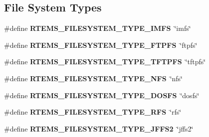 \subsection*{File System Types}
\begin{DoxyCompactItemize}
\item 
\mbox{\label{group__FileSystemTypesAndMount_ga2d3e51f948d15fca2149a164ced80c82}} 
\#define {\bfseries R\+T\+E\+M\+S\+\_\+\+F\+I\+L\+E\+S\+Y\+S\+T\+E\+M\+\_\+\+T\+Y\+P\+E\+\_\+\+I\+M\+FS}~\char`\"{}imfs\char`\"{}
\item 
\mbox{\label{group__FileSystemTypesAndMount_gad37d5c10b7269c04afd547110fd8eba2}} 
\#define {\bfseries R\+T\+E\+M\+S\+\_\+\+F\+I\+L\+E\+S\+Y\+S\+T\+E\+M\+\_\+\+T\+Y\+P\+E\+\_\+\+F\+T\+P\+FS}~\char`\"{}ftpfs\char`\"{}
\item 
\mbox{\label{group__FileSystemTypesAndMount_gabec56985b669ea652cbe5930188073bf}} 
\#define {\bfseries R\+T\+E\+M\+S\+\_\+\+F\+I\+L\+E\+S\+Y\+S\+T\+E\+M\+\_\+\+T\+Y\+P\+E\+\_\+\+T\+F\+T\+P\+FS}~\char`\"{}tftpfs\char`\"{}
\item 
\mbox{\label{group__FileSystemTypesAndMount_gab8c15c488fb84b23c34d3353e13af1c7}} 
\#define {\bfseries R\+T\+E\+M\+S\+\_\+\+F\+I\+L\+E\+S\+Y\+S\+T\+E\+M\+\_\+\+T\+Y\+P\+E\+\_\+\+N\+FS}~\char`\"{}nfs\char`\"{}
\item 
\mbox{\label{group__FileSystemTypesAndMount_ga9ae53861e6e6636d6e5781fa56e54403}} 
\#define {\bfseries R\+T\+E\+M\+S\+\_\+\+F\+I\+L\+E\+S\+Y\+S\+T\+E\+M\+\_\+\+T\+Y\+P\+E\+\_\+\+D\+O\+S\+FS}~\char`\"{}dosfs\char`\"{}
\item 
\mbox{\label{group__FileSystemTypesAndMount_gaebc2a1717f0c19c906e781c57882e587}} 
\#define {\bfseries R\+T\+E\+M\+S\+\_\+\+F\+I\+L\+E\+S\+Y\+S\+T\+E\+M\+\_\+\+T\+Y\+P\+E\+\_\+\+R\+FS}~\char`\"{}rfs\char`\"{}
\item 
\mbox{\label{group__FileSystemTypesAndMount_ga1af8f3b805f43646a212f62c1bdd43be}} 
\#define {\bfseries R\+T\+E\+M\+S\+\_\+\+F\+I\+L\+E\+S\+Y\+S\+T\+E\+M\+\_\+\+T\+Y\+P\+E\+\_\+\+J\+F\+F\+S2}~\char`\"{}jffs2\char`\"{}
\end{DoxyCompactItemize}


